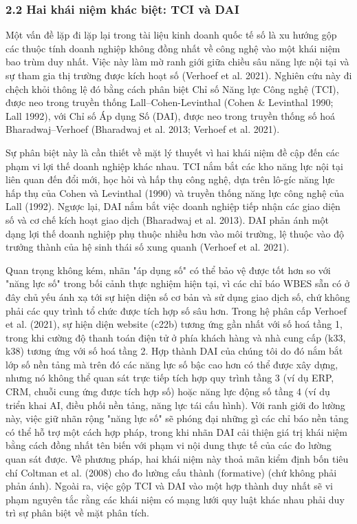 \documentclass[12pt,a4paper]{article}
\begin{document}
\hypertarget{22-hai-khuxe1i-niux1ec7m-khuxe1c-biux1ec7t-tci-vuxe0-dai}{%
\subsubsection{2.2 Hai khái niệm khác biệt: TCI và
DAI}\label{22-hai-khuxe1i-niux1ec7m-khuxe1c-biux1ec7t-tci-vuxe0-dai}}

Một vấn đề lặp đi lặp lại trong tài liệu kinh doanh quốc tế số là xu
hướng gộp các thuộc tính doanh nghiệp không đồng nhất về công nghệ vào
một khái niệm bao trùm duy nhất. Việc này làm mờ ranh giới giữa chiều
sâu năng lực nội tại và sự tham gia thị trường được kích hoạt số
(Verhoef et al. 2021). Nghiên cứu này đi chệch khỏi thông lệ đó bằng
cách phân biệt Chỉ số Năng lực Công nghệ (TCI), được neo trong truyền
thống Lall--Cohen-Levinthal (Cohen \& Levinthal 1990; Lall 1992), với
Chỉ số Áp dụng Số (DAI), được neo trong truyền thống số hoá
Bharadwaj--Verhoef (Bharadwaj et al. 2013; Verhoef et al. 2021).

Sự phân biệt này là cần thiết về mặt lý thuyết vì hai khái niệm đề cập
đến các phạm vi lợi thế doanh nghiệp khác nhau. TCI nắm bắt các kho năng
lực nội tại liên quan đến đổi mới, học hỏi và hấp thụ công nghệ, dựa
trên lô-gíc năng lực hấp thụ của Cohen và Levinthal (1990) và truyền
thống năng lực công nghệ của Lall (1992). Ngược lại, DAI nắm bắt việc
doanh nghiệp tiếp nhận các giao diện số và cơ chế kích hoạt giao dịch
(Bharadwaj et al. 2013). DAI phản ánh một dạng lợi thế doanh nghiệp phụ
thuộc nhiều hơn vào môi trường, lệ thuộc vào độ trưởng thành của hệ sinh
thái số xung quanh (Verhoef et al. 2021).

Quan trọng không kém, nhãn "áp dụng số" có thể bảo vệ được tốt hơn so
với "năng lực số" trong bối cảnh thực nghiệm hiện tại, vì các chỉ báo
WBES sẵn có ở đây chủ yếu ánh xạ tới sự hiện diện số cơ bản và sử dụng
giao dịch số, chứ không phải các quy trình tổ chức được tích hợp số sâu
hơn. Trong hệ phân cấp Verhoef et al. (2021), sự hiện diện website
(c22b) tương ứng gần nhất với số hoá tầng 1, trong khi cường độ thanh
toán điện tử ở phía khách hàng và nhà cung cấp (k33, k38) tương ứng với
số hoá tầng 2. Hợp thành DAI của chúng tôi do đó nắm bắt lớp số nền tảng
mà trên đó các năng lực số bậc cao hơn có thể được xây dựng, nhưng nó
không thể quan sát trực tiếp tích hợp quy trình tầng 3 (ví dụ ERP, CRM,
chuỗi cung ứng được tích hợp số) hoặc năng lực động số tầng 4 (ví dụ
triển khai AI, điều phối nền tảng, năng lực tái cấu hình). Với ranh giới
đo lường này, việc giữ nhãn rộng "năng lực số" sẽ phóng đại những gì các
chỉ báo nền tảng có thể hỗ trợ một cách hợp pháp, trong khi nhãn DAI cải
thiện giá trị khái niệm bằng cách đồng nhất tên biến với phạm vi nội
dung thực tế của các đo lường quan sát được. Về phương pháp, hai khái
niệm này thoả mãn kiểm định bốn tiêu chí Coltman et al. (2008) cho đo
lường cấu thành (formative) (chứ không phải phản ánh). Ngoài ra, việc
gộp TCI và DAI vào một hợp thành duy nhất sẽ vi phạm nguyên tắc rằng các
khái niệm có mạng lưới quy luật khác nhau phải duy trì sự phân biệt về
mặt phân tích.
\end{document}
